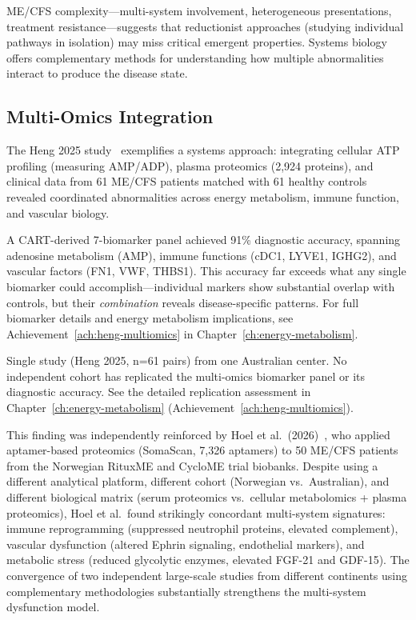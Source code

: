 ME/CFS complexity---multi-system involvement, heterogeneous presentations, treatment resistance---suggests that reductionist approaches (studying individual pathways in isolation) may miss critical emergent properties. Systems biology offers complementary methods for understanding how multiple abnormalities interact to produce the disease state.

\subsection{Multi-Omics Integration}

\begin{achievement}
\label{ach:systems-biomarkers}
The Heng 2025 study~\cite{heng2025mecfs} exemplifies a systems approach: integrating cellular ATP profiling (measuring AMP/ADP), plasma proteomics (2,924 proteins), and clinical data from 61 ME/CFS patients matched with 61 healthy controls revealed coordinated abnormalities across energy metabolism, immune function, and vascular biology.

A CART-derived 7-biomarker panel achieved 91\% diagnostic accuracy, spanning adenosine metabolism (AMP), immune functions (cDC1, LYVE1, IGHG2), and vascular factors (FN1, VWF, THBS1). This accuracy far exceeds what any single biomarker could accomplish---individual markers show substantial overlap with controls, but their \textit{combination} reveals disease-specific patterns. For full biomarker details and energy metabolism implications, see Achievement~\ref{ach:heng-multiomics} in Chapter~\ref{ch:energy-metabolism}.
\end{achievement}

\begin{warning}
Single study (Heng 2025, n=61 pairs) from one Australian center. No independent cohort has replicated the multi-omics biomarker panel or its diagnostic accuracy. See the detailed replication assessment in Chapter~\ref{ch:energy-metabolism} (Achievement~\ref{ach:heng-multiomics}).
\end{warning}

This finding was independently reinforced by Hoel et al.\ (2026)~\cite{Hoel2026proteome}, who applied aptamer-based proteomics (SomaScan, 7,326 aptamers) to 50 ME/CFS patients from the Norwegian RituxME and CycloME trial biobanks. Despite using a different analytical platform, different cohort (Norwegian vs.\ Australian), and different biological matrix (serum proteomics vs.\ cellular metabolomics + plasma proteomics), Hoel et al.\ found strikingly concordant multi-system signatures: immune reprogramming (suppressed neutrophil proteins, elevated complement), vascular dysfunction (altered Ephrin signaling, endothelial markers), and metabolic stress (reduced glycolytic enzymes, elevated FGF-21 and GDF-15). The convergence of two independent large-scale studies from different continents using complementary methodologies substantially strengthens the multi-system dysfunction model.

